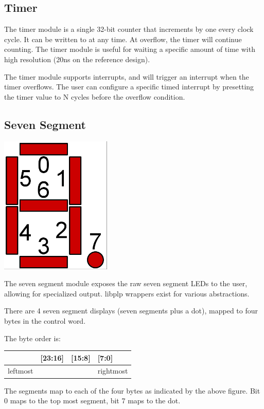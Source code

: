\documentclass{article}
\begin{document}
\subsection{Timer}
The timer module is a single 32-bit counter that increments by one every clock cycle. It can be written to at any time. At overflow, the timer will continue counting. The timer module is useful for waiting a specific amount of time with high resolution (20ns on the reference design).

The timer module supports interrupts, and will trigger an interrupt when the timer overflows. The user can configure a specific timed interrupt by presetting the timer value to N cycles before the overflow condition. 

\subsection{Seven Segment}
\begin{center}
\includegraphics[scale=0.5]{../../images/sseg.png}
\end{center}
The seven segment module exposes the raw seven segment LEDs to the user, allowing for specialized output. libplp wrappers exist for various abstractions.

There are 4 seven segment displays (seven segments plus a dot), mapped to four bytes in the control word.

The byte order is: 

\begin{tabular}{ | l | l | l | l |}
\hline
[31:24] & [23:16] & [15:8] & [7:0] \\
\hline
leftmost & & & rightmost \\
\hline
\end{tabular}

The segments map to each of the four bytes as indicated by the above figure. Bit 0 maps to the top most segment, bit 7 maps to the dot. 
\end{document}

